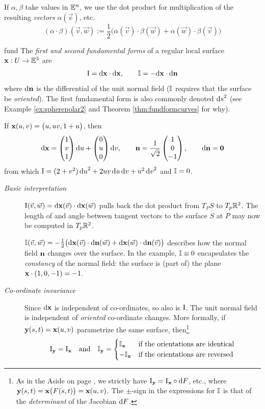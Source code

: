 If $\alpha,\beta$ take values in $\mathbb{E}^n$, we use the dot product for multiplication of the resulting \emph{vectors} $\alpha(\vec v)$, etc.
\[
	(\alpha\cdot\beta)(\vec v,\vec w):=\frac 12\bigl(\alpha(\vec v)\cdot\beta(\vec w)+\alpha(\vec w)\cdot\beta(\vec v)\bigr)
\]

\begin{defn}{}{fund}
	The \emph{first and second fundamental forms} of a regular local surface ${\mathbf{x}}:U\to\mathbb{E}^3$ are
	\[
		\mathrm{I}=\mathrm{d}{\mathbf{x}}\cdot\mathrm{d}{\mathbf{x}},\qquad \mathbb{I}=-\mathrm{d}{\mathbf{x}}\cdot\mathrm{d}{\mathbf{n}}
	\]
	where $\mathrm{d}{\mathbf{n}}$ is the differential of the unit normal field ($\mathbb{I}$ requires that the surface be \emph{oriented}). The first fundamental form is also commonly denoted ${\mathrm{d} s}^2$ (see Example \ref{ex:spherepolar2} and Theorem \ref{thm:fundformcurves} for why).
\end{defn}


\begin{example}{}{}
	If ${\mathbf{x}}(u,v)=\bigl(u,uv,1+u\bigr)$, then 
	\[
		\mathrm{d}{\mathbf{x}}=\begin{pmatrix}1\\v\\1\end{pmatrix}{\mathrm{d}u}+\begin{pmatrix}0\\u\\0\end{pmatrix}{\mathrm{d}v},\qquad {\mathbf{n}}=\frac 1{\sqrt 2}\begin{pmatrix}1\\0\\-1\end{pmatrix},\qquad \mathrm{d}{\mathbf{n}}=\mathbf{0}
	\]
	from which $\mathrm{I}=(2+v^2)\,{\mathrm{d} u}^2+2uv\,{\mathrm{d} u}\,{\mathrm{d} v}+u^2\,{\mathrm{d} v}^2$ and $\mathbb{I}=0$.
\end{example}

\goodbreak



\begin{description}
	\item[\normalfont\emph{Basic interpretation}]\label{sec:formsmeaning} $\mathrm{I}(\vec v,\vec w)=\mathrm{d}{\mathbf{x}}(\vec v)\cdot\mathrm{d}{\mathbf{x}}(\vec w)$ pulls back the dot product from $T_PS$ to $T_p\mathbb{R}^2$. The length of and angle between tangent vectors to the surface $S$ at $P$ may now be computed in $T_p\mathbb{R}^2$.\par
	 	$\mathbb{I}(\vec v,\vec w)=-\frac 12\bigl(\mathrm{d}{\mathbf{x}}(\vec v)\cdot\mathrm{d}{\mathbf{n}}(\vec w)+\mathrm{d}{\mathbf{x}}(\vec w)\cdot\mathrm{d}{\mathbf{n}}(\vec v)\bigr)$ describes how the normal field ${\mathbf{n}}$ changes over the surface. In the example, $\mathbb{I}\equiv 0$ encapsulates the \emph{constancy} of the normal field: the surface is (part of) the plane ${\mathbf{x}}\cdot(1,0,-1)=-1$.
	
	\item[\normalfont\emph{Co-ordinate invariance}] Since $\mathrm{d}{\mathbf{x}}$ is independent of co-ordinates, so also is $\mathrm{I}$. The unit normal field is independent of \emph{oriented} co-ordinate changes. More formally, if ${\mathbf{y}}(s,t)={\mathbf{x}}(u,v)$ parametrize the same surface, then\footnote{As in the Aside on page \pageref{aside:coc}, we strictly have $\mathrm{I}_{\mathbf{y}}=\mathrm{I}_{\mathbf{x}}\circ \mathrm{d} F$, etc., where ${\mathbf{y}}(s,t)={\mathbf{x}}\bigl(F(s,t)\bigr)={\mathbf{x}}(u,v)$. The $\pm$-sign in the expressions for $\mathbb{I}$ is that of the \emph{determinant} of the Jacobian $\mathrm{d} F$.}
	\[
		\mathrm{I}_{\mathbf{y}}=\mathrm{I}_{\mathbf{x}}\quad \text{and}\quad \mathbb{I}_{\mathbf{y}}=
		\begin{cases}
			\mathbb{I}_{\mathbf{x}}&\text{if the orientations are identical}\\
			-\mathbb{I}_{\mathbf{x}}&\text{if the orientations are reversed}
		\end{cases}
	\]
\end{description}

